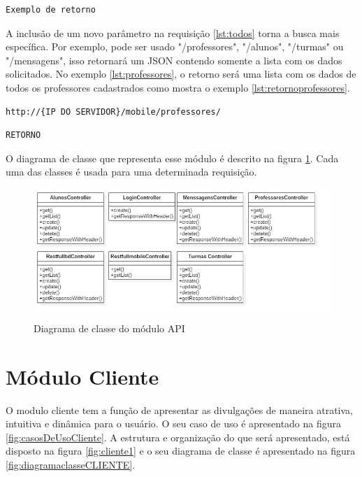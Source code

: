 \begin{lstlisting}[caption={Retorno da requisição \ref{lst:todos}},label={lst:retornotodos}]
	Exemplo de retorno
\end{lstlisting}

A inclusão de um novo parâmetro na requisição \ref{lst:todos} torna a busca mais específica. Por exemplo, pode ser usado "/professores", "/alunos", "/turmas" ou "/mensagens", isso retornará um JSON contendo somente a lista com os dados solicitados. No exemplo \ref{lst:professores}, o retorno será uma lista com os dados de todos os professores cadastrados como mostra o exemplo \ref{lst:retornoprofessores}.

\begin{lstlisting}[caption={Requisitar lista de dados especifica},label={lst:professores}]
	http://{IP DO SERVIDOR}/mobile/professores/
\end{lstlisting}

\begin{lstlisting}[caption={Retorno da requisição \ref{lst:bd}},label={lst:retornoprofessores}]
	RETORNO
\end{lstlisting}

O diagrama de classe que representa esse módulo é descrito na figura \ref{fig:diagramaclasseAPI}. Cada uma das classes é usada para uma determinada requisição.
\begin{figure}[H]
\centering
\includegraphics[scale=0.5]{figuras/diagramaclasseAPI}
\caption{Diagrama de classe do módulo API}
\label{fig:diagramaclasseAPI}
\end{figure}

\section{Módulo Cliente}
\label{sec:cliente}
O modulo cliente tem a função de apresentar as divulgações de maneira atrativa, intuitiva e dinâmica para o usuário. O seu caso de uso é apresentado na figura \ref{fig:casosDeUsoCliente}. A estrutura e organização do que será apresentado, está disposto na figura \ref{fig:cliente1} e o seu diagrama de classe é apresentado na figura \ref{fig:diagramaclasseCLIENTE}.

